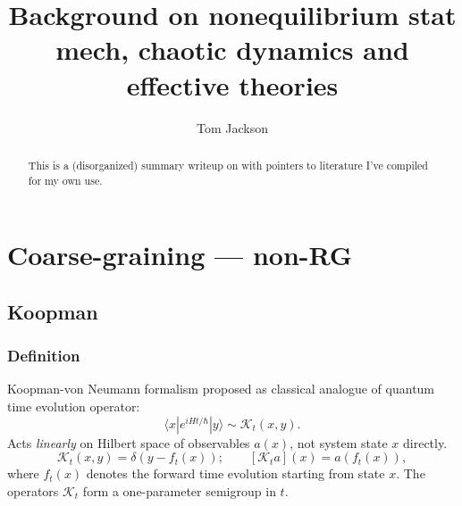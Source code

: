 \documentclass[notitlepage,openany,11pt]{report}
\makeatletter
\theoremstyle{plain}%
\numberwithin{equation}{section}
\newcommand*{\toccontents}{\@starttoc{toc}}
\makeatother
\begin{document}
\newcommand {\be}{\begin{equation*}}
\newcommand {\ee} {\end{equation*}}
\newcommand{\boldref}[1]{\textbf{\ref{#1}}}
\newcommand{\boldnameref}[1]{\textbf{\nameref{#1}}}

\newcommand{\mbf}[1]{\mathbf{#1}}
\newcommand{\mbb}[1]{\mathbb{#1}}
\newcommand{\mcal}[1]{\mathcal{#1}}
\newcommand{\mtilde}[1]{\widetilde{#1}}
\newcommand{\mhat}[1]{\widehat{#1}}
\newcommand{\mol}[1]{\overline{#1}}


\title{Background on nonequilibrium stat mech, chaotic dynamics and effective theories}
\author{Tom Jackson}

\hypersetup{pageanchor=false} %

\maketitle

\begin{abstract}
This is a (disorganized) summary writeup on with pointers to literature I've compiled for my own use.\end{abstract}

\hypersetup{pageanchor=true}

\toccontents

\restoregeometry




\chapter{Coarse-graining --- non-RG}

\section{Koopman}

\subsection{Definition}
Koopman-von Neumann formalism proposed as classical analogue of quantum time evolution operator:
\be
\langle x |e^{iHt/\hbar} | y \rangle \sim \mcal{K}_t(x,y).
\ee 
Acts \emph{linearly} on Hilbert space of observables $a(x)$, not system state $x$ directly.
\be
\mcal{K}_t(x,y) = \delta(y - f_t(x)); \qquad [\mcal{K}_t a](x) = a(f_t(x)),
\ee
where $f_t(x)$ denotes the forward time evolution starting from state $x$. The operators $\mcal{K}_t$ form a one-parameter semigroup in $t$.
\end{document}
